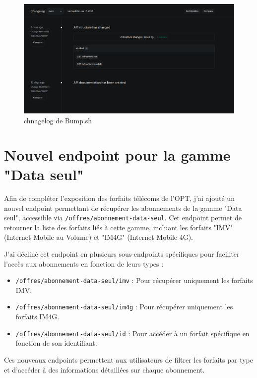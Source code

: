 \documentclass{article}
\begin{document}
	\begin{figure}[H] \centering \includegraphics[width=\textwidth]{asset/changelog.png} \caption{chnagelog de Bump.sh} \label{fig:sonarq}\end{figure}
	
	\section{Nouvel endpoint pour la gamme "Data seul"}
	
	Afin de compléter l'exposition des forfaits télécoms de l'OPT, j'ai ajouté un nouvel endpoint permettant de récupérer les abonnements de la gamme "Data seul", accessible via \texttt{/offres/abonnement-data-seul}. Cet endpoint permet de retourner la liste des forfaits liés à cette gamme, incluant les forfaits "IMV" (Internet Mobile au Volume) et "IM4G" (Internet Mobile 4G).
	
	J'ai décliné cet endpoint en plusieurs sous-endpoints spécifiques pour faciliter l'accès aux abonnements en fonction de leurs types :
	\begin{itemize}
		\item \texttt{/offres/abonnement-data-seul/imv} : Pour récupérer uniquement les forfaits IMV.
		\item \texttt{/offres/abonnement-data-seul/im4g} : Pour récupérer uniquement les forfaits IM4G.
		\item \texttt{/offres/abonnement-data-seul/{id}} : Pour accéder à un forfait spécifique en fonction de son identifiant.
	\end{itemize}
	
	Ces nouveaux endpoints permettent aux utilisateurs de filtrer les forfaits par type et d'accéder à des informations détaillées sur chaque abonnement.
	
\end{document}

